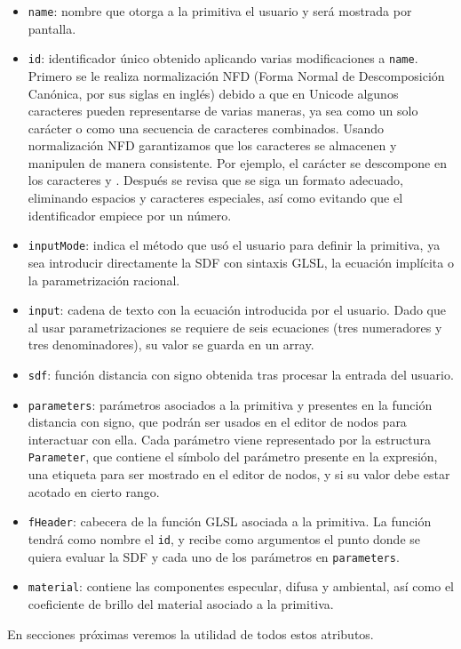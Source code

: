 \begin{itemize}
    \item \texttt{name}: nombre que otorga a la primitiva el usuario y será mostrada por pantalla.
    \item \texttt{id}: identificador único obtenido aplicando varias modificaciones a \texttt{name}. Primero se le realiza normalización NFD (Forma Normal de Descomposición Canónica, por sus siglas en inglés) debido a que en Unicode algunos caracteres pueden representarse de varias maneras, ya sea como un solo carácter o como una secuencia de caracteres combinados. Usando normalización NFD garantizamos que los caracteres se almacenen y manipulen de manera consistente. Por ejemplo, el carácter  se descompone en los caracteres  y . Después se revisa que se siga un formato adecuado, eliminando espacios y caracteres especiales, así como evitando que el identificador empiece por un número.
    \item \texttt{inputMode}: indica el método que usó el usuario para definir la primitiva, ya sea introducir directamente la SDF con sintaxis GLSL, la ecuación implícita o la parametrización racional.
    \item \texttt{input}: cadena de texto con la ecuación introducida por el usuario. Dado que al usar parametrizaciones se requiere de seis ecuaciones (tres numeradores y tres denominadores), su valor se guarda en un array.
    \item \texttt{sdf}: función distancia con signo obtenida tras procesar la entrada del usuario.
    \item \texttt{parameters}: parámetros asociados a la primitiva y presentes en la función distancia con signo, que podrán ser usados en el editor de nodos para interactuar con ella. Cada parámetro viene representado por la estructura \texttt{Parameter}, que contiene el símbolo del parámetro presente en la expresión, una etiqueta para ser mostrado en el editor de nodos, y si su valor debe estar acotado en cierto rango. 
    \item \texttt{fHeader}: cabecera de la función GLSL asociada a la primitiva. La función tendrá como nombre el \texttt{id}, y recibe como argumentos el punto donde se quiera evaluar la SDF y cada uno de los parámetros en \texttt{parameters}.
    \item \texttt{material}: contiene las componentes especular, difusa y ambiental, así como el coeficiente de brillo del material asociado a la primitiva.
\end{itemize}
En secciones próximas veremos la utilidad de todos estos atributos.

